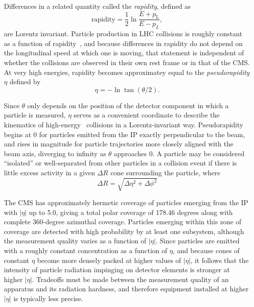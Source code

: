 Differences in a related quantity called the \textit{rapidity}, defined as
\begin{equation}
\mathrm{rapidity} = \frac{1}{2}\ln{\frac{E+p_\mathrm{L}}{E-p_{L}}},
\label{eq:rapidity}
\end{equation}
are Lorentz invariant. Particle production in LHC collisions is roughly constant as a function of rapidity~\cite{ref:lhcrun1harvest_ch3}, and because
differences in rapidity do not depend on the longitudinal speed at which one is moving, that statement is independent
of whether the collisions are observed in their own rest frame or in that of the CMS. At very high
energies, rapidity becomes approximatey equal to the \textit{pseudorapidity} $\eta$ defined by
\begin{equation}
\eta = -\ln{\tan{(\theta/2)}}.
\label{eq:pseudorapidity}
\end{equation}

Since $\theta$ only depends on the position of the detector component in which a particle is measured, $\eta$
serves as a convenient coordinate to describe the kinematics of high-energy \Pp\Pp\ collisions in a Lorentz-invariant way.
Pseudorapidity begins at 0 for particles emitted from the IP exactly perpendicular to the beam, and rises in magnitude for particle
trajectories more closely aligned with the beam axis, diverging to infinity as $\theta$ approaches 0. A particle may be considered ``isolated''
or well-separated from other particles in a collision event if there is little excess activity in a given $\Delta R$ cone surrounding
the particle, where
\begin{equation}
\Delta R = \sqrt{\Delta\eta^{2} + \Delta\phi^{2}}
\label{eq:deltaR}
\end{equation}

The CMS has approximately hermetic coverage of particles emerging from the IP with $|\eta|$
up to 5.0, giving a total polar coverage of 178.46 degrees along with complete 360-degree azimuthal coverage. Particles emerging
within this zone of coverage are detected with high probability by at least one subsystem, although the measurement quality varies
as a function of $|\eta|$. Since particles are emitted with a roughly constant concentration as a function of $\eta$, and because
cones of constant $\eta$ become more densely packed at higher values of $|\eta|$, it follows that the intensity of particle radiation
impinging on detector elements is stronger at higher $|\eta|$. Tradeoffs must be made between the measurement quality of an apparatus
and its radiation hardness, and therefore equipment installed at higher $|\eta|$ is typically less precise.

